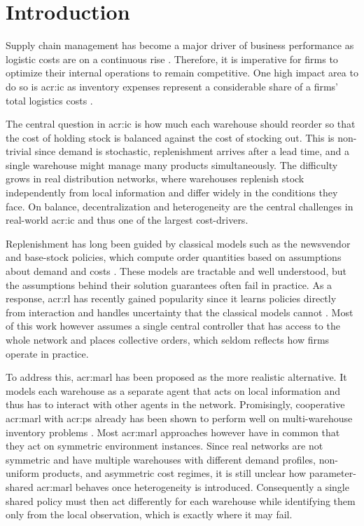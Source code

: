 \chapter{Introduction}
\label{chap:intro}

Supply chain management has become a major driver of business performance as logistic costs are on a continuous rise \citep{kearney2026geopolitical}. Therefore, it is imperative for firms to optimize their internal operations to remain competitive. One high impact area to do so is \gls{acr:ic} as inventory expenses represent a considerable share of a firms’ total logistics costs \citep{roodbergen2014simultaneous, lancioni2000new}. 

The central question in \gls{acr:ic} is how much each warehouse should reorder so that the cost of holding stock is balanced against the cost of stocking out. This is non-trivial since demand is stochastic, replenishment arrives after a lead time, and a single warehouse might manage many products simultaneously. The difficulty grows in real distribution networks, where warehouses replenish stock independently from local information and differ widely in the conditions they face. On balance, decentralization and heterogeneity are the central challenges in real-world \gls{acr:ic} and thus one of the largest cost-drivers. 

Replenishment has long been guided by classical models such as the newsvendor and base-stock policies, which compute order quantities based on assumptions about demand and costs \citep{scarf1960sSoptimality, Chen2026}. These models are tractable and well understood, but the assumptions behind their solution guarantees often fail in practice. As a response, \gls{acr:rl} has recently gained popularity since it learns policies directly from interaction and handles uncertainty that the classical models cannot \citep{boute2022roadmap}. Most of this work however assumes a single central controller that has access to the whole network and places collective orders, which seldom reflects how firms operate in practice.

To address this, \gls{acr:marl} has been proposed as the more realistic alternative. It models each warehouse as a separate agent that acts on local information and thus has to interact with other agents in the network. Promisingly, cooperative \gls{acr:marl} with \gls{acr:ps} already has been shown to perform well on multi-warehouse inventory problems \citep{mousa2024analysis}. Most \gls{acr:marl} approaches however have in common that they act on symmetric environment instances. Since real networks are not symmetric and have multiple warehouses with different demand profiles, non-uniform products, and asymmetric cost regimes, it is still unclear how parameter-shared \gls{acr:marl} behaves once heterogeneity is introduced. Consequently a single shared policy must then act differently for each warehouse while identifying them only from the local observation, which is exactly where it may fail.

